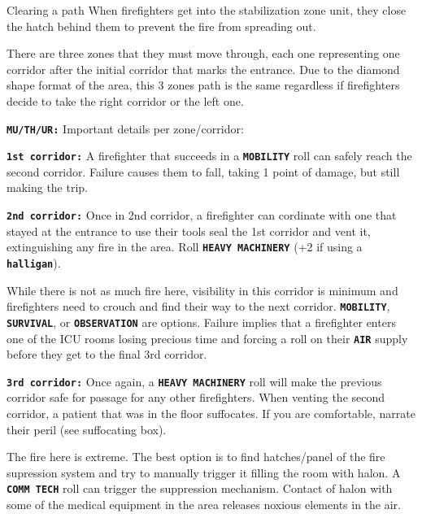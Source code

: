 \begin{rpg-commentbox}{Clearing a path}
    When firefighters get into the stabilization zone unit, they close the hatch behind them to prevent the fire from spreading out. 
    
    There are three zones that they must  move through, each one representing one corridor after the initial corridor that marks the entrance.    
    Due to the diamond shape format of the area, this 3 zones path is the same regardless if firefighters decide to take the right corridor or the left one.
    
    \texttt{\textbf{MU/TH/UR:}} Important details per zone/corridor:
    
    \texttt{\textbf{1st corridor:}} A firefighter that succeeds in a \texttt{\textbf{MOBILITY}} roll can safely reach the second corridor. Failure causes them to fall, taking 1 point of damage, but still making the trip.

    \texttt{\textbf{2nd corridor:}} Once in 2nd corridor, a firefighter can cordinate with one that stayed at the entrance to use their tools seal the 1st corridor and vent it, extinguishing any fire in the area. Roll \texttt{\textbf{HEAVY MACHINERY}} (+2 if using a  \texttt{\textbf{halligan}}). 

    While there is not as much fire here, visibility in this corridor is minimum and firefighters need to crouch and find their way to the next corridor. 
    \texttt{\textbf{MOBILITY}}, \texttt{\textbf{SURVIVAL}}, or \texttt{\textbf{OBSERVATION}} are options. Failure implies that a firefighter enters one of the ICU rooms losing precious time and forcing a roll on their \texttt{\textbf{AIR}} supply before they get to the final 3rd corridor.  

    \texttt{\textbf{3rd corridor:}} Once again, a \texttt{\textbf{HEAVY MACHINERY}} roll will make the previous corridor safe for passage for any other firefighters. When venting the second corridor, a patient that was in the floor suffocates. If you are comfortable, narrate their peril (see suffocating box).
    
    The fire here is extreme. The best option is to find hatches/panel of the fire supression system and try to manually trigger it filling the room with halon. 
    A \texttt{\textbf{COMM TECH}} roll can trigger the suppression mechanism.
    Contact of halon with some of the medical equipment in the area releases 
    noxious elements in the air. 
\end{rpg-commentbox}  


